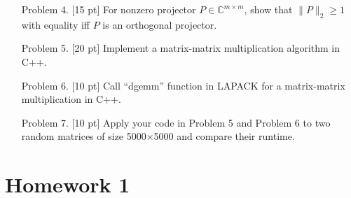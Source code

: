 \begin{enumerate}[leftmargin=*]
\item[Problem 4.] [15 pt] For nonzero projector $P\in\mathbb{C}^{m\times m}$, show that $\|P\|_2 \geq 1$ with equality iff $P$ is an orthogonal projector.

\item[Problem 5.] [20 pt] Implement a matrix-matrix multiplication algorithm in C++.

\item[Problem 6.] [10 pt] Call “dgemm” function in LAPACK for a matrix-matrix multiplication in C++.

\item[Problem 7.] [10 pt] Apply your code in Problem 5 and Problem 6 to two random matrices of size 5000×5000
and compare their runtime.
\end{enumerate}

\section{Homework 1}
